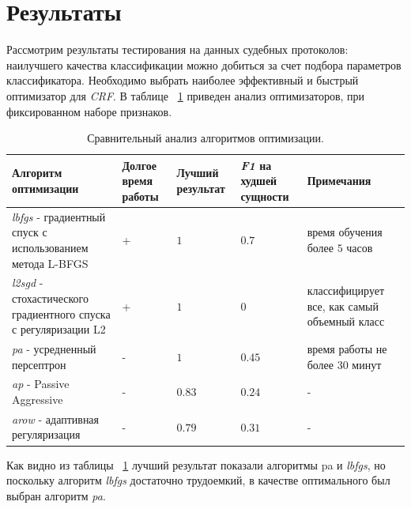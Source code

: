 \documentclass{csmathnotes}
\begin{document}
\section*{Результаты}
Рассмотрим результаты тестирования на данных судебных протоколов: наилучшего качества классификации можно добиться за счет подбора параметров классификатора. Необходимо выбрать наиболее эффективный и быстрый оптимизатор для \emph{CRF}. В таблице ~\ref{tabl:table1} приведен анализ оптимизаторов, при фиксированном наборе признаков.
\begin{table}[h]
	\begin{center}
		\begin{tabular}{|p{3cm}|p{1.3cm}|p{1.5cm}|p{1.5cm}|p{2.5cm}|}
			\hline
			Алгоритм оптимизации &  Долгое время работы & Лучший результат & \emph{F1} на худшей сущности & Примечания \\
			\hline
			\emph{lbfgs} - градиентный спуск с использованием метода 
			L-BFGS & + & $1$ & $0.7$ & время обучения более $5$ часов  \\
			\hline
			\emph{l2sgd} - стохастического  градиентного спуска  с регуляризации L2 & + & $1$  & $0$ & классифицирует все, как самый объемный класс \\
			\hline
			\emph{pa} - усредненный персептрон & - & $1$  & $0.45$ & время работы не более $30$ минут \\
			\hline
			\emph{ap} - Passive Aggressive & - & $0.83$ & $0.24$  & - \\
			\hline
			\emph{arow} - адаптивная регуляризация  & - & $0.79$ & $0.31$  & - \\
			\hline
		\end{tabular}
	\end{center}
	\caption{\label{tabl:table1}Сравнительный анализ алгоритмов оптимизации.}
\end{table}

Как видно из таблицы ~\ref{tabl:table1} лучший результат показали алгоритмы pa и \emph{lbfgs}, но поскольку алгоритм \emph{lbfgs}  достаточно трудоемкий, в качестве оптимального был выбран алгоритм \emph{pa}.
\end{document}
